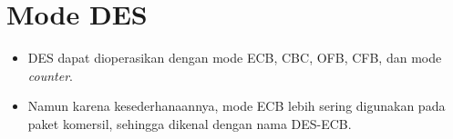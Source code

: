 \documentclass{article}
\begin{document}

\section*{Mode DES}

\begin{itemize}
    \item DES dapat dioperasikan dengan mode ECB, CBC, OFB, CFB, dan mode \textit{counter}.
    \item Namun karena kesederhanaannya, mode ECB lebih sering digunakan pada paket komersil, sehingga dikenal dengan nama DES-ECB.
\end{itemize}
\end{document}
